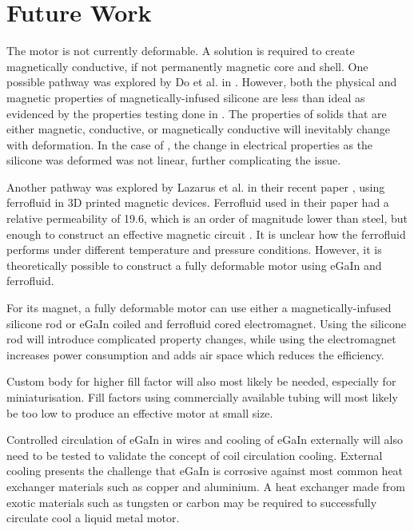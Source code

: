 \documentclass[a4paper,12pt]{article}
\begin{document}
\section{Future Work}
The motor is not currently deformable. A solution is required to create magnetically conductive, if not permanently magnetic core and shell. One possible pathway was explored by Do et al. in \cite{doMiniatureSoftElectromagnetic2018}. However, both the physical and magnetic properties of magnetically-infused silicone are less than ideal as evidenced by the properties testing done in \cite{valentaMechanicalElectricalTesting2008}. The properties of solids that are either magnetic, conductive, or magnetically conductive will inevitably change with deformation. In the case of \cite{valentaMechanicalElectricalTesting2008}, the change in electrical properties as the silicone was deformed was not linear, further complicating the issue.

Another pathway was explored by Lazarus et al. in their recent paper \cite{lazarusCreating3DPrinted2019}, using ferrofluid in 3D printed magnetic devices. Ferrofluid used in their paper had a relative permeability of 19.6, which is an order of magnitude lower than steel, but enough to construct an effective magnetic circuit \cite{ferrotecFerrotecFerrofluidInnovating2019}. It is unclear how the ferrofluid performs under different temperature and pressure conditions. However, it is theoretically possible to construct a fully deformable motor using eGaIn and ferrofluid.

For its magnet, a fully deformable motor can use either a magnetically-infused silicone rod or eGaIn coiled and ferrofluid cored electromagnet. Using the silicone rod will introduce complicated property changes, while using the electromagnet increases power consumption and adds air space which reduces the efficiency.

Custom body for higher fill factor will also most likely be needed, especially for miniaturisation. Fill factors using commercially available tubing will most likely be too low to produce an effective motor at small size.

Controlled circulation of eGaIn in wires and cooling of eGaIn externally will also need to be tested to validate the concept of coil circulation cooling. External cooling presents the challenge that eGaIn is corrosive against most common heat exchanger materials such as copper and aluminium. A heat exchanger made from exotic materials such as tungsten or carbon may be required to successfully circulate cool a liquid metal motor.
\end{document}
